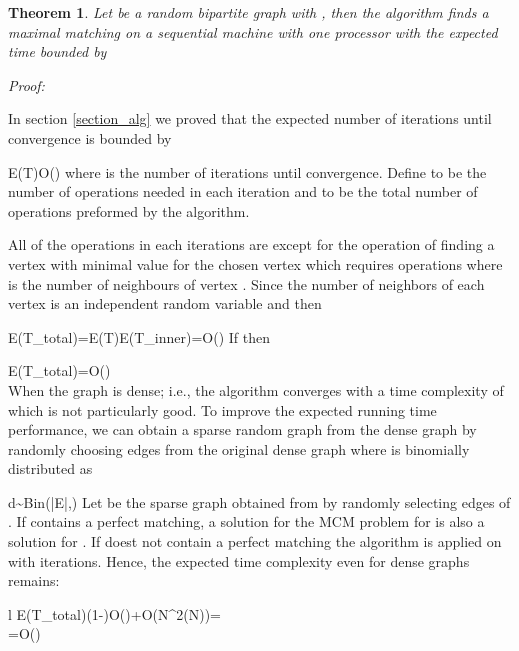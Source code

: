\documentclass[11pt,onecolumn]{article}
\newcounter{theorem}
\newcommand{\beq}{}
\newcommand{\bea}{\begin{array}}
\newcommand{\ena}{\end{array}}
\newenvironment{proof}{\textit{Proof:}}{\hfill\\}
\newtheorem{theorem}{Theorem}
\begin{document}
\begin{theorem}\label{theorem_seq} Let  be a random bipartite graph with , then the algorithm finds a maximal matching on a sequential machine with one processor with the expected time bounded by 
\end{theorem}
\begin{proof}

In section \ref{section_alg} we proved that the expected number of iterations until convergence is bounded by
\beq
E\left(T\right)\leq O\left(\right)
\eeq
where  is the number of iterations until convergence.
Define  to be the number of operations needed in each iteration and  to be the total number of operations preformed by the algorithm.


All of the operations in each iterations are  except for the operation of finding a vertex with minimal value for the chosen vertex  which requires  operations where  is the number of neighbours of vertex . Since the number of neighbors of each vertex is an independent random variable and   then
\beq
E\left(T_{total}\right)=E\left(T\right)E\left(T_{inner}\right)=O\left(\right)
\eeq
If  then
\beq
E\left(T_{total}\right)=O\left(\right)
\eeq
\end{proof}
When the graph is dense; i.e.,  the algorithm converges with a time complexity of  which is not particularly good. To improve the expected running time performance, we can obtain a sparse random graph from the dense graph by randomly choosing  edges from the original dense graph where  is binomially distributed as
\beq
d\sim Bin(|E|,)
\eeq
Let  be the sparse graph obtained from  by randomly selecting  edges of . If  contains a perfect matching, a solution for the MCM problem for  is also a solution for . If  doest not contain a perfect matching the algorithm is applied on  with  iterations. Hence, the expected time complexity even for dense graphs remains:
\beq
\bea{l}
\displaystyle E\left(T_{total}\right)\leq\left(1-\right)O\left(\right)+O\left(N^2\log(N)\right)=\\
\displaystyle =O\left(\right)
\ena
\eeq
\end{document}
